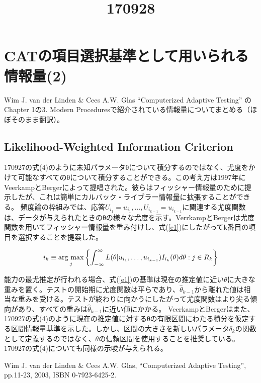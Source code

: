 \documentclass[a4j]{jarticle}
\date{}
\title{170928}
\begin{document}
\maketitle

\section{CATの項目選択基準として用いられる情報量(2)}
Wim J. van der Linden \& Cees A.W. Glas ``Computerized Adaptive Testing'' \cite{b1}のChapter 1の3. Modern Proceduresで紹介されている情報量についてまとめる（ほぼそのまま翻訳）。

\subsection{Likelihood-Weighted Information Criterion}
170927の式(4)のように未知パラメータθについて積分するのではなく、尤度をかけて可能なすべてのθについて積分することができる。この考え方は1997年にVeerkampとBergerによって提唱された。彼らはフィッシャー情報量のために提示したが、これは簡単にカルバック・ライブラー情報量に拡張することができる。
頻度論の枠組みでは、応答$U_{i_{1}}=u_{i_{1}},\ldots,U_{i_{k-1}}=u_{i_{k-1}}$に関連する尤度関数は、データが与えられたときのθの様々な尤度を示す。VerrkampとBergerは尤度関数を用いてフィッシャー情報量を重み付けし、式(\ref{e1})にしたがってk番目の項目を選択することを提案した。

\newcommand{\argmax}{\mathop{\rm arg~max}\limits}
\begin{eqnarray}
  \label{e1}
  i_{k} \equiv \argmax_{j}\left\{\int_{-\infty}^{\infty}L(\theta|u_{i_{1}},\ldots,u_{i_{k-1}})I_{i_{k}}(\theta)d\theta:j\in R_{k}\right\}
\end{eqnarray}

能力の最尤推定が行われる場合、式(\ref{e1})の基準は現在の推定値に近い$\theta$に大きな重みを置く。テストの開始期に尤度関数は平らであり、$\hat{\theta}_{k-1}$から離れた値は相当な重みを受ける。テストが終わりに向かうにしたがって尤度関数はより尖る傾向があり、すべての重みは$\hat{\theta}_{k-1}$に近い値にかかる。
VeerkampとBergerはまた、170927の式(4)のように現在の推定値に対するθの有限区間にわたる積分を仮定する区間情報量基準を示した。しかし、区間の大きさを新しいパラメータ$\delta_{k}$の関数として定義するのではなく、$\theta$の信頼区間を使用することを推奨している。170927の式(4)についても同様の示唆が与えられる。

\begin{thebibliography}{9}
   Wim J. van der Linden \& Cees A.W. Glas, ``Computerized Adaptive Testing'', pp.11-23, 2003, ISBN 0-7923-6425-2.
\end{thebibliography}
\end{document}
